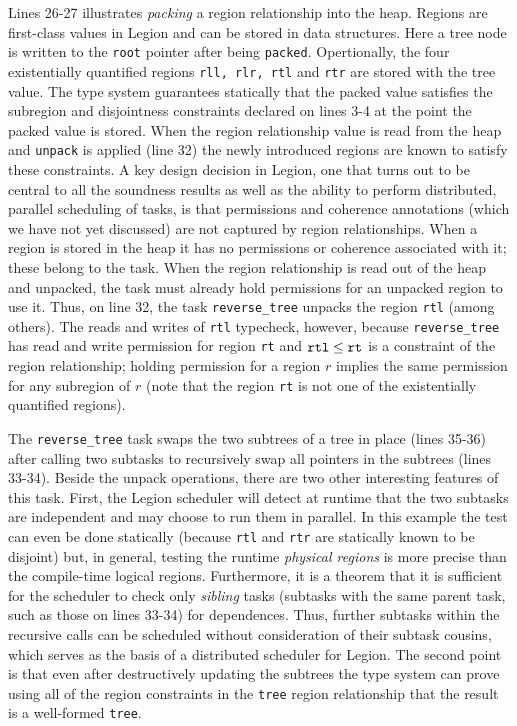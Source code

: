 Lines 26-27 illustrates {\em packing} a region relationship into the heap.
Regions are first-class values in Legion and can be stored in data structures.
Here a tree node is written to the {\tt root} pointer after being {\tt packed}.
Opertionally, the four existentially quantified regions {\tt rll, rlr, rtl} and {\tt rtr} are
stored with the tree value.  The type system guarantees statically that the packed value
satisfies the subregion and disjointness constraints declared on lines 3-4 at the point
the packed value is stored.  When the region relationship value is read 
from the heap and {\tt unpack} is applied (line 32) the newly introduced regions are known to 
satisfy these constraints.  A key design decision in Legion, one that turns out to be
central to all the soundness results as well as the ability to perform distributed, parallel
scheduling of tasks, is that permissions and coherence annotations (which we have not yet discussed)
are not captured by region relationships.  When a region is stored in the heap it has no
permissions or coherence associated with it; these belong to the task.  When the region relationship
is read out of the heap and unpacked, the task must already hold permissions for an unpacked region 
to use it. Thus, on line 32, the task {\tt reverse\_tree} unpacks the region {\tt rtl} (among others).
The reads and writes of {\tt rtl} typecheck, however, because {\tt reverse\_tree} has read and
write permission for region {\tt rt} and $\tt rtl \leq rt$ is a constraint of the region relationship; holding
permission for a region $r$ implies the same permission for any subregion of $r$ (note
that the region {\tt rt} is not one of the existentially quantified regions).

The {\tt reverse\_tree} task swaps the two subtrees of a tree in place (lines 35-36) after calling two
subtasks to recursively swap all pointers in the subtrees (lines 33-34).  Beside the unpack operations, there
are two other interesting features of this task.  First, the Legion scheduler will detect at runtime that the two
subtasks are independent and may choose to run them in parallel.  In this example the test can even be done
statically (because {\tt rtl} and {\tt rtr} are statically known to be disjoint) but, in general, testing the
runtime {\em physical regions} is more precise than the compile-time logical regions.  Furthermore, it is a theorem
that it is sufficient for the scheduler to check only {\em sibling} tasks (subtasks with the same parent task,
such as those on lines 33-34) for dependences.  Thus, further subtasks within the recursive calls can be scheduled
without consideration of their subtask cousins, which serves as the basis of a distributed scheduler for Legion.
The second point is that
even after destructively updating the subtrees the type system can prove using all of the region constraints in the
{\tt tree} region relationship that the result is a well-formed {\tt tree}.

